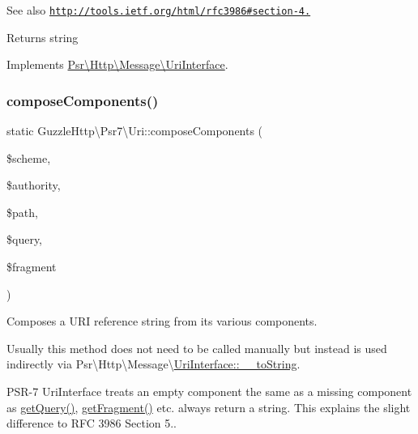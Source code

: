 \begin{DoxySeeAlso}{See also}
\href{http://tools.ietf.org/html/rfc3986#section-4.1}{\tt http\+://tools.\+ietf.\+org/html/rfc3986\#section-\/4.} 
\end{DoxySeeAlso}
\begin{DoxyReturn}{Returns}
string 
\end{DoxyReturn}


Implements \hyperlink{interfacePsr_1_1Http_1_1Message_1_1UriInterface_a322566ef8139a72e4a3da1feffafb1e6}{Psr\textbackslash{}\+Http\textbackslash{}\+Message\textbackslash{}\+Uri\+Interface}.

\mbox{\label{classGuzzleHttp_1_1Psr7_1_1Uri_a55774932d840a511df95f7e7ca8e8598}} 
\subsubsection{\texorpdfstring{compose\+Components()}{composeComponents()}}
{\footnotesize\ttfamily static Guzzle\+Http\textbackslash{}\+Psr7\textbackslash{}\+Uri\+::compose\+Components (\begin{DoxyParamCaption}\item[{}]{\$scheme,  }\item[{}]{\$authority,  }\item[{}]{\$path,  }\item[{}]{\$query,  }\item[{}]{\$fragment }\end{DoxyParamCaption})\hspace{0.3cm}{\ttfamily [static]}}

Composes a U\+RI reference string from its various components.

Usually this method does not need to be called manually but instead is used indirectly via {\ttfamily Psr\textbackslash{}Http\textbackslash{}Message\textbackslash{}\hyperlink{interfacePsr_1_1Http_1_1Message_1_1UriInterface_a322566ef8139a72e4a3da1feffafb1e6}{Uri\+Interface\+::\+\_\+\+\_\+to\+String}}.

P\+S\+R-\/7 Uri\+Interface treats an empty component the same as a missing component as \hyperlink{classGuzzleHttp_1_1Psr7_1_1Uri_a67650b5b4d619cb30e2951da11d0f369}{get\+Query()}, \hyperlink{classGuzzleHttp_1_1Psr7_1_1Uri_aeda26bc60e5aef6d506ce43be28409ca}{get\+Fragment()} etc. always return a string. This explains the slight difference to R\+FC 3986 Section 5..


